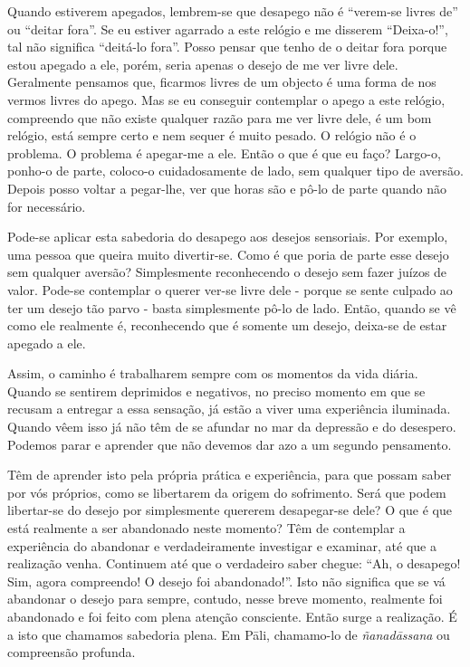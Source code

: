 Quando estiverem apegados, lembrem-se que desapego não é “verem-se livres de” ou
“deitar fora”. Se eu estiver agarrado a este relógio e me disserem “Deixa-o!”,
tal não significa “deitá-lo fora”. Posso pensar que tenho de o deitar fora
porque estou apegado a ele, porém, seria apenas o desejo de me ver livre dele.
Geralmente pensamos que, ficarmos livres de um objecto é uma forma de nos vermos
livres do apego. Mas se eu conseguir contemplar o apego a este relógio,
compreendo que não existe qualquer razão para me ver livre dele, é um bom
relógio, está sempre certo e nem sequer é muito pesado. O relógio não é o
problema. O problema é apegar-me a ele. Então o que é que eu faço? Largo-o,
ponho-o de parte, coloco-o cuidadosamente de lado, sem qualquer tipo de aversão.
Depois posso voltar a pegar-lhe, ver que horas são e pô-lo de parte quando não
for necessário.

Pode-se aplicar esta sabedoria do desapego aos desejos sensoriais. Por exemplo,
uma pessoa que queira muito divertir-se. Como é que poria de parte esse desejo
sem qualquer aversão? Simplesmente reconhecendo o desejo sem fazer juízos de
valor. Pode-se contemplar o querer ver-se livre dele - porque se sente culpado
ao ter um desejo tão parvo - basta simplesmente pô-lo de lado. Então, quando se
vê como ele realmente é, reconhecendo que é somente um desejo, deixa-se de estar
apegado a ele.

Assim, o caminho é trabalharem sempre com os momentos da vida diária. Quando se
sentirem deprimidos e negativos, no preciso momento em que se recusam a entregar
a essa sensação, já estão a viver uma experiência iluminada. Quando vêem isso já
não têm de se afundar no mar da depressão e do desespero. Podemos parar e
aprender que não devemos dar azo a um segundo pensamento.

Têm de aprender isto pela própria prática e experiência, para que possam saber
por vós próprios, como se libertarem da origem do sofrimento. Será que podem
libertar-se do desejo por simplesmente quererem desapegar-se dele? O que é que
está realmente a ser abandonado neste momento? Têm de contemplar a experiência
do abandonar e verdadeiramente investigar e examinar, até que a realização
venha. Continuem até que o verdadeiro saber chegue: “Ah, o desapego! Sim, agora
compreendo! O desejo foi abandonado!”. Isto não significa que se vá abandonar o
desejo para sempre, contudo, nesse breve momento, realmente foi abandonado e foi
feito com plena atenção consciente. Então surge a realização. É a isto que
chamamos sabedoria plena. Em Pāli, chamamo-lo de \emph{ñanadāssana} ou
compreensão profunda.

